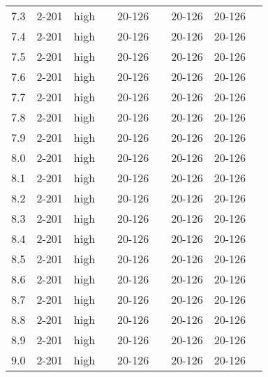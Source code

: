 \documentclass{article}
\begin{document}
\begin{center}
\begin{tabular}{| c | c | c | c | c | c | c | c | c |}
      7.3 & 2-201 & high &  & 20-126 &  & 20-126 & 20-126 &\\
      7.4 & 2-201 & high &  & 20-126 &  & 20-126 & 20-126 &\\
      7.5 & 2-201 & high &  & 20-126 &  & 20-126 & 20-126 &\\
      7.6 & 2-201 & high &  & 20-126 &  & 20-126 & 20-126 &\\
      7.7 & 2-201 & high &  & 20-126 &  & 20-126 & 20-126 &\\
      7.8 & 2-201 & high &  & 20-126 &  & 20-126 & 20-126 &\\
      7.9 & 2-201 & high &  & 20-126 &  & 20-126 & 20-126 &\\
      8.0 & 2-201 & high &  & 20-126 &  & 20-126 & 20-126 &\\
      8.1 & 2-201 & high &  & 20-126 &  & 20-126 & 20-126 &\\
      8.2 & 2-201 & high &  & 20-126 &  & 20-126 & 20-126 &\\
      8.3 & 2-201 & high &  & 20-126 &  & 20-126 & 20-126 &\\
      8.4 & 2-201 & high &  & 20-126 &  & 20-126 & 20-126 &\\
      8.5 & 2-201 & high &  & 20-126 &  & 20-126 & 20-126 &\\
      8.6 & 2-201 & high &  & 20-126 &  & 20-126 & 20-126 &\\
      8.7 & 2-201 & high &  & 20-126 &  & 20-126 & 20-126 &\\
      8.8 & 2-201 & high &  & 20-126 &  & 20-126 & 20-126 &\\
      8.9 & 2-201 & high &  & 20-126 &  & 20-126 & 20-126 &\\
      9.0 & 2-201 & high &  & 20-126 &  & 20-126 & 20-126 &\\
      \hline
    \end{tabular}
    \end{center}
\end{document}
